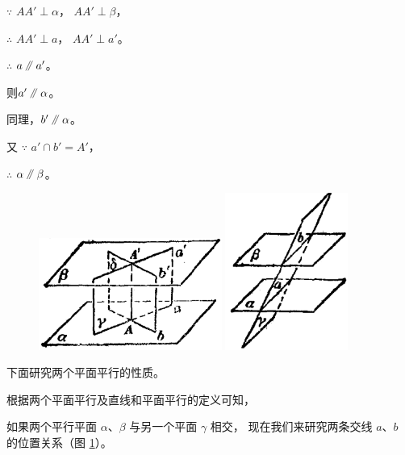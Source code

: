 $\because$ \quad $AA' \perp \alpha$， $AA' \perp \beta$，

$\therefore$ \quad $AA' \perp a$， $AA' \perp a'$。

$\therefore$ \quad $a \pingxing a'$。

则\quad $a' \pingxing \alpha$。

同理，$b' \pingxing \alpha$。

\hspace*{-1.5em} 又 $\because$ \quad $a' \cap b' = A'$，

$\therefore$ \quad $\alpha \pingxing \beta$。

\begin{figure}[htbp]
    \centering
    \begin{minipage}[b]{7cm}
        \centering
        \includegraphics[width=6cm]{../pic/ltjh-ch1-40.png}
        \caption{}\label{fig:ltjh-1-40}
    \end{minipage}
    \qquad
    \begin{minipage}[b]{7cm}
        \centering
        \includegraphics[width=4cm]{../pic/ltjh-ch1-41.png}
        \caption{}\label{fig:ltjh-1-41}
    \end{minipage}
\end{figure}

下面研究两个平面平行的性质。

根据两个平面平行及直线和平面平行的定义可知，

如果两个平行平面 $\alpha$、$\beta$ 与另一个平面 $\gamma$ 相交，
现在我们来研究两条交线 $a$、$b$ 的位置关系（图 \ref{fig:ltjh-1-41}）。

